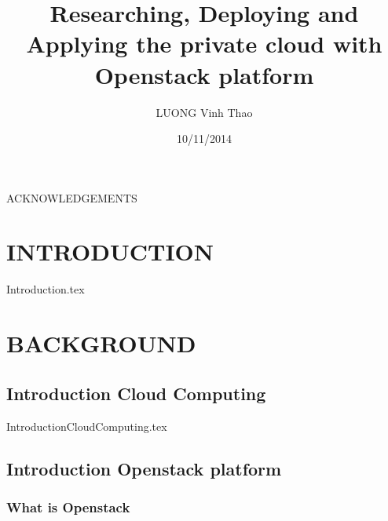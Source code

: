 \documentclass[12pt, a4paper,titlepage, fleqn]{report}%
\begin{document}

\title{Researching, Deploying and Applying the private cloud with Openstack platform}

\begin{center}
\author{LUONG Vinh Thao}
\date{10/11/2014}
\end{center}
\maketitle
\tableofcontents
\clearpage



\begin{abstract}
%
\end{abstract}
\clearpage

ACKNOWLEDGEMENTS

\clearpage


\chapter{INTRODUCTION}

{Introduction.tex}


\chapter{BACKGROUND}

	\section{Introduction Cloud Computing}
		{IntroductionCloudComputing.tex}

	\section{Introduction Openstack platform}
		\subsection {What is Openstack}
\end{document}
